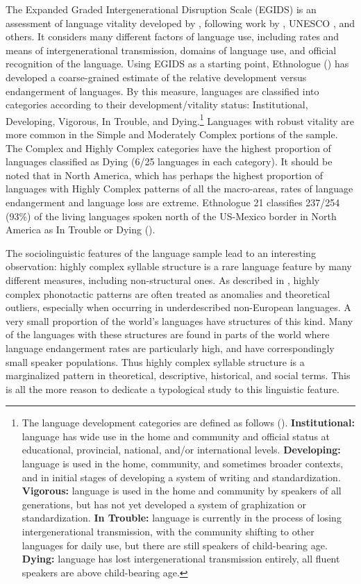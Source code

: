   The Expanded Graded Intergenerational Disruption Scale (EGIDS) is an assessment of language vitality developed by \citet{LewisSimons2010}, following work by \citet{Fishman1991}, UNESCO \citep{BrenzingerEtAl2003}, and others. It considers many different factors of language use, including rates and means of intergenerational transmission, domains of language use, and official recognition of the language. Using EGIDS as a starting point, Ethnologue (\citealt{SimonsFennig2018}) has developed a coarse-grained estimate of the relative development versus endangerment of languages. By this measure, languages are classified into categories according to their development/vitality status: Institutional, Developing, Vigorous, In Trouble, and Dying.\footnote{{The language development categories are defined as follows (\citealt{SimonsFennig2018}).} \textrm{\textbf{Institutional:} }\textrm{language has wide use in the home and community and official status at educational, provincial, national, and/or international levels.} \textrm{\textbf{Developing:} }\textrm{language is used in the home, community, and sometimes broader contexts, and in initial stages of developing a system of writing and standardization.}\textrm{ }\textrm{\textbf{Vigorous:} }\textrm{language is used in the home and community by speakers of all generations, but has not yet developed a system of graphization or standardization}\textrm{. }\textrm{\textbf{In Trouble:}} \textrm{language is currently in the process of losing intergenerational transmission, with the community shifting to other languages for daily use, but there are still speakers of child-bearing age.}\textrm{ }\textrm{\textbf{Dying:}} \textrm{language has lost intergenerational transmission entirely, all fluent speakers are above child-bearing age.}} Languages with robust vitality are more common in the Simple and Moderately Complex portions of the sample. The Complex and Highly Complex categories have the highest proportion of languages classified as Dying (6/25 languages in each category). It should be noted that in North America, which has perhaps the highest proportion of languages with Highly Complex patterns of all the macro-areas, rates of language endangerment and language loss are extreme. Ethnologue 21 classifies 237/254 (93\%) of the living languages spoken north of the US-Mexico border in North America as In Trouble or Dying (\citealt{SimonsFennig2018}). 

  The sociolinguistic features of the language sample lead to an interesting observation: highly complex syllable structure is a rare language feature by many different measures, including non-structural ones. As described in , highly complex phonotactic patterns are often treated as anomalies and theoretical outliers, especially when occurring in underdescribed non-European languages. A very small proportion of the world’s languages have structures of this kind. Many of the languages with these structures are found in parts of the world where language endangerment rates are particularly high, and have correspondingly small speaker populations. Thus highly complex syllable structure is a  marginalized pattern in theoretical, descriptive, historical, and social terms. This is all the more reason to dedicate a typological study to this linguistic feature.

